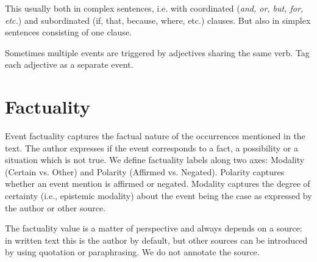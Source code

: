 This usually both in complex sentences, i.e. with coordinated (\textit{and, or, but, for, etc.}) and subordinated (if, that, because, where, etc.) clauses.
But also in simplex sentences consisting of one clause.

\begin{exe}
    \ex {}
    \ex {}
\end{exe}

Sometimes multiple events are triggered by adjectives sharing the same verb. Tag each adjective as a separate event.

\section{Factuality}

Event factuality captures the factual nature of the occurrences mentioned in the text.
The author expresses if the event corresponds to a fact, a possibility or a situation which is not true.
We define factuality labels along two axes: Modality (Certain vs. Other) and Polarity (Affirmed vs. Negated).
Polarity captures whether an event mention is affirmed or negated.
Modality captures the degree of certainty (i.e., epistemic modality) about the event being the case as expressed by the author or other source.

The factuality value is a matter of perspective and always depends on a source: in written text this is the author by default, but other sources can be introduced by using quotation or paraphrasing.
We do not annotate the source.

